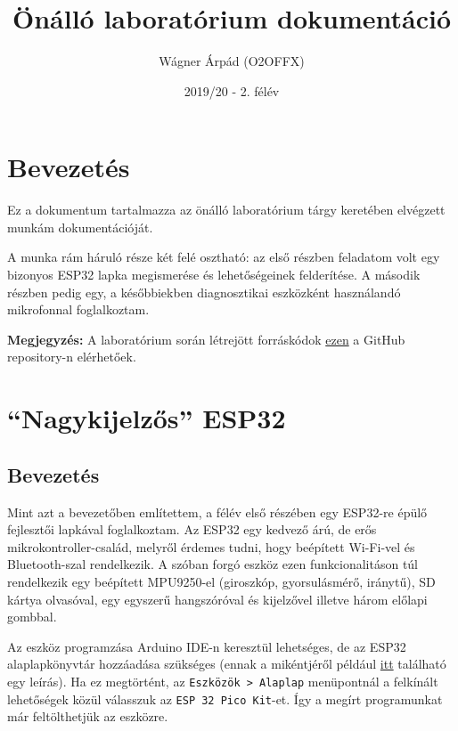 \documentclass[12pt,a4paper]{article}
\title{Önálló laboratórium dokumentáció}
\author{Wágner Árpád (O2OFFX)}
\date{2019/20 - 2. félév}
\begin{document}
  \maketitle

  \section{Bevezetés}

    Ez a dokumentum tartalmazza az önálló laboratórium tárgy keretében elvégzett munkám dokumentációját.

    A munka rám háruló része két felé osztható: az első részben feladatom volt egy bizonyos ESP32 lapka megismerése és lehetőségeinek felderítése. A második részben pedig egy, a későbbiekben diagnosztikai eszközként használandó mikrofonnal foglalkoztam.

    \textbf{Megjegyzés:} A laboratórium során létrejött forráskódok \href{https://github.com/awrpad/Onlab}{ezen} a GitHub repository-n elérhetőek.

  \newpage

  \section{``Nagykijelzős'' ESP32}

    \subsection{Bevezetés}
      Mint azt a bevezetőben említettem, a félév első részében egy ESP32-re épülő fejlesztői lapkával foglalkoztam.
      Az ESP32 egy kedvező árú, de erős mikrokontroller-család, melyről érdemes tudni, hogy beépített Wi-Fi-vel és Bluetooth-szal rendelkezik. A szóban forgó eszköz ezen funkcionalitáson túl rendelkezik egy beépített MPU9250-el (giroszkóp, gyorsulásmérő, iránytű), SD kártya olvasóval, egy egyszerű hangszóróval és kijelzővel illetve három előlapi gombbal.

      Az eszköz programzása Arduino IDE-n keresztül lehetséges, de az ESP32 alaplapkönyvtár hozzáadása szükséges (ennak a mikéntjéről például \href{https://randomnerdtutorials.com/installing-the-esp32-board-in-arduino-ide-windows-instructions/}{itt} található egy leírás). Ha ez megtörtént, az \texttt{Eszközök > Alaplap} menüpontnál a felkínált lehetőségek közül válasszuk az \texttt{ESP 32 Pico Kit}-et. Így a megírt programunkat már feltölthetjük az eszközre.
\end{document}
